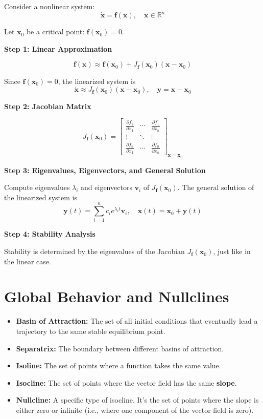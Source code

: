 Consider a nonlinear system:
\[
\dot{\mathbf{x}} = \mathbf{f}(\mathbf{x}), \quad \mathbf{x} \in \mathbb{R}^n
\]

Let $\mathbf{x}_0$ be a critical point: $\mathbf{f}(\mathbf{x}_0) = 0$.

\textbf{Step 1: Linear Approximation}

\[
\mathbf{f}(\mathbf{x}) \approx \mathbf{f}(\mathbf{x}_0) + J_{\mathbf{f}}(\mathbf{x}_0)(\mathbf{x} - \mathbf{x}_0)
\]

Since $\mathbf{f}(\mathbf{x}_0) = 0$, the linearized system is
\[
\dot{\mathbf{x}} \approx J_{\mathbf{f}}(\mathbf{x}_0) (\mathbf{x} - \mathbf{x}_0), \quad
\mathbf{y} = \mathbf{x} - \mathbf{x}_0
\]

\textbf{Step 2: Jacobian Matrix}

\[
J_{\mathbf{f}}(\mathbf{x}_0) =
\begin{bmatrix}
\frac{\partial f_1}{\partial x_1} & \cdots & \frac{\partial f_1}{\partial x_n} \\
\vdots & \ddots & \vdots \\
\frac{\partial f_n}{\partial x_1} & \cdots & \frac{\partial f_n}{\partial x_n} 
\end{bmatrix}_{\mathbf{x} = \mathbf{x}_0}
\]

\textbf{Step 3: Eigenvalues, Eigenvectors, and General Solution}

Compute eigenvalues $\lambda_i$ and eigenvectors $\mathbf{v}_i$ of $J_{\mathbf{f}}(\mathbf{x}_0)$.  
The general solution of the linearized system is
\[
\mathbf{y}(t) = \sum_{i=1}^n c_i e^{\lambda_i t} \mathbf{v}_i, \quad
\mathbf{x}(t) = \mathbf{x}_0 + \mathbf{y}(t)
\]

\textbf{Step 4: Stability Analysis}

Stability is determined by the eigenvalues of the Jacobian $J_{\mathbf{f}}(\mathbf{x}_0)$, just like in the linear case.

\section*{Global Behavior and Nullclines}

\begin{itemize}
  \item \textbf{Basin of Attraction:} The set of all initial conditions that eventually lead a trajectory to the same stable equilibrium point.
  \item \textbf{Separatrix:} The boundary between different basins of attraction.
  \item \textbf{Isoline:} The set of points where a function takes the same value.
  \item \textbf{Isocline:} The set of points where the vector field has the same \textbf{slope}.
  \item \textbf{Nullcline:} A specific type of isocline. It's the set of points where the slope is either zero or infinite (i.e., where one component of the vector field is zero).
\end{itemize}

